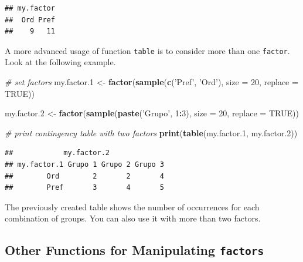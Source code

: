 \documentclass[11pt,]{book}
\newenvironment{Shaded}{\begin{snugshade}}{\end{snugshade}}
\newcommand{\KeywordTok}[1]{\textcolor[rgb]{0.27,0.27,0.27}{\textbf{#1}}}
\newcommand{\DataTypeTok}[1]{\textcolor[rgb]{0.27,0.27,0.27}{#1}}
\newcommand{\DecValTok}[1]{\textcolor[rgb]{0.06,0.06,0.06}{#1}}
\newcommand{\StringTok}[1]{\textcolor[rgb]{0.5,0.5,0.5}{#1}}
\newcommand{\CommentTok}[1]{\textcolor[rgb]{0.56,0.35,0.01}{\textit{#1}}}
\newcommand{\OtherTok}[1]{\textcolor[rgb]{0.56,0.35,0.01}{#1}}
\newcommand{\OperatorTok}[1]{\textcolor[rgb]{0.81,0.36,0.00}{\textbf{#1}}}
\newcommand{\NormalTok}[1]{#1}
\begin{document}
\begin{verbatim}
## my.factor
##  Ord Pref 
##    9   11
\end{verbatim}

A more advanced usage of function \texttt{table} is to consider more
than one \texttt{factor}. Look at the following example.

\begin{Shaded}
\begin{Highlighting}[]
\CommentTok{# set factors}
\NormalTok{my.factor.}\DecValTok{1}\NormalTok{ <-}\StringTok{ }\KeywordTok{factor}\NormalTok{(}\KeywordTok{sample}\NormalTok{(}\KeywordTok{c}\NormalTok{(}\StringTok{'Pref'}\NormalTok{, }\StringTok{'Ord'}\NormalTok{), }
                             \DataTypeTok{size =} \DecValTok{20}\NormalTok{, }
                             \DataTypeTok{replace =} \OtherTok{TRUE}\NormalTok{))}
                             
\NormalTok{my.factor.}\DecValTok{2}\NormalTok{ <-}\StringTok{ }\KeywordTok{factor}\NormalTok{(}\KeywordTok{sample}\NormalTok{(}\KeywordTok{paste}\NormalTok{(}\StringTok{'Grupo'}\NormalTok{, }\DecValTok{1}\OperatorTok{:}\DecValTok{3}\NormalTok{), }
                             \DataTypeTok{size =} \DecValTok{20}\NormalTok{, }
                             \DataTypeTok{replace =} \OtherTok{TRUE}\NormalTok{))}

\CommentTok{# print contingency table with two factors}
\KeywordTok{print}\NormalTok{(}\KeywordTok{table}\NormalTok{(my.factor.}\DecValTok{1}\NormalTok{, my.factor.}\DecValTok{2}\NormalTok{))}
\end{Highlighting}
\end{Shaded}

\begin{verbatim}
##            my.factor.2
## my.factor.1 Grupo 1 Grupo 2 Grupo 3
##        Ord        2       2       4
##        Pref       3       4       5
\end{verbatim}

The previously created table shows the number of occurrences for each
combination of groups. You can also use it with more than two factors.

\subsection{\texorpdfstring{Other Functions for Manipulating
\texttt{factors}}{Other Functions for Manipulating factors}}\label{other-functions-for-manipulating-factors}
\end{document}
